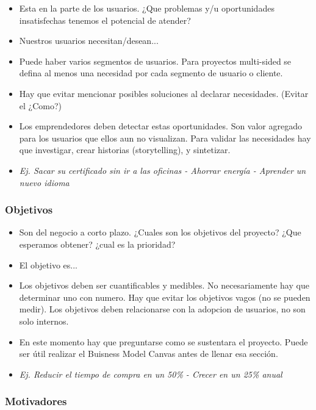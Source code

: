 \documentclass[titlepage,a4paper]{article}
\begin{document}
\begin{itemize}
    \item Esta en la parte de los usuarios. ¿Que problemas y/u oportunidades insatisfechas tenemos el potencial de atender? 
    \item Nuestros usuarios necesitan/desean...
    \item Puede haber varios segmentos de usuarios. Para proyectos multi-sided se defina al menos una necesidad por cada segmento de usuario o cliente.
    \item Hay que evitar mencionar posibles soluciones al declarar necesidades. (Evitar el ¿Como?)
    \item Los emprendedores deben detectar estas oportunidades. Son valor agregado para los usuarios que ellos aun no visualizan. Para validar las necesidades hay que investigar, crear historias (storytelling), y sintetizar.
    \item \textit{Ej. Sacar su certificado sin ir a las oficinas - Ahorrar energía - Aprender un nuevo idioma}
\end{itemize}

\subsubsection*{Objetivos}

\begin{itemize}
    \item Son del negocio a corto plazo. ¿Cuales son los objetivos del proyecto? ¿Que esperamos obtener? ¿cual es la prioridad?
    \item El objetivo es...
    \item Los objetivos deben ser cuantificables y medibles. No necesariamente hay que determinar uno con numero. Hay que evitar los objetivos vagos (no se pueden medir). Los objetivos deben relacionarse con la adopcion de usuarios, no son solo internos.
    \item En este momento hay que preguntarse como se sustentara el proyecto. Puede ser útil realizar el Buisness Model Canvas antes de llenar esa sección.
    \item \textit{Ej. Reducir el tiempo de compra en un 50\% - Crecer en un 25\% anual}
\end{itemize}

\subsubsection*{Motivadores}
\end{document}
